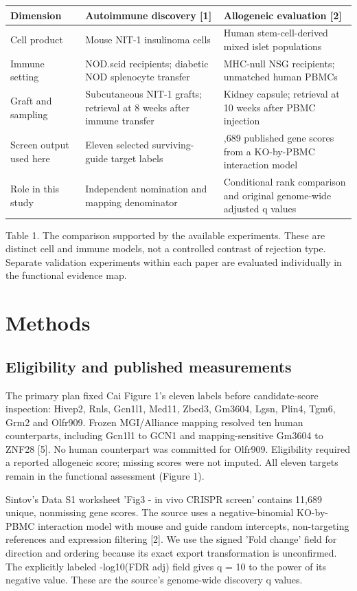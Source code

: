 \documentclass[11pt,letterpaper]{article}
\begin{document}
\begin{table}[!htbp]\centering\small
\renewcommand{\arraystretch}{1.15}
\begin{tabularx}{\linewidth}{@{}>{\raggedright\arraybackslash}X>{\raggedright\arraybackslash}X>{\raggedright\arraybackslash}X@{}}
\toprule
Dimension & Autoimmune discovery [1] & Allogeneic evaluation [2]\\\midrule
Cell product & Mouse NIT-1 insulinoma cells & Human stem-cell-derived mixed islet populations\\
Immune setting & NOD.scid recipients; diabetic NOD splenocyte transfer & MHC-null NSG recipients; unmatched human PBMCs\\
Graft and sampling & Subcutaneous NIT-1 grafts; retrieval at 8 weeks after immune transfer & Kidney capsule; retrieval at 10 weeks after PBMC injection\\
Screen output used here & Eleven selected surviving-guide target labels & 11,689 published gene scores from a KO-by-PBMC interaction model\\
Role in this study & Independent nomination and mapping denominator & Conditional rank comparison and original genome-wide adjusted q values\\
\bottomrule\end{tabularx}
\par\vspace{5pt}Table 1. The comparison supported by the available experiments. These are distinct cell and immune models, not a controlled contrast of rejection type. Separate validation experiments within each paper are evaluated individually in the functional evidence map.
\end{table}
\section*{Methods}
\subsection*{Eligibility and published measurements}
The primary plan fixed Cai Figure 1's eleven labels before candidate-score inspection: Hivep2, Rnls, Gcn1l1, Med11, Zbed3, Gm3604, Lgsn, Plin4, Tgm6, Grm2 and Olfr909. Frozen MGI/Alliance mapping resolved ten human counterparts, including Gcn1l1 to GCN1 and mapping-sensitive Gm3604 to ZNF28 [5]. No human counterpart was committed for Olfr909. Eligibility required a reported allogeneic score; missing scores were not imputed. All eleven targets remain in the functional assessment (Figure 1).\par
Sintov's Data S1 worksheet 'Fig3 - in vivo CRISPR screen' contains 11,689 unique, nonmissing gene scores. The source uses a negative-binomial KO-by-PBMC interaction model with mouse and guide random intercepts, non-targeting references and expression filtering [2]. We use the signed 'Fold change' field for direction and ordering because its exact export transformation is unconfirmed. The explicitly labeled -log10(FDR adj) field gives q = 10 to the power of its negative value. These are the source's genome-wide discovery q values.\par
\end{document}
